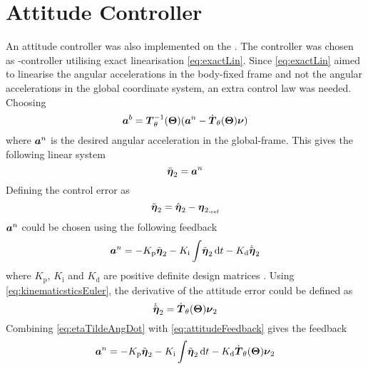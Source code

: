 \section{Attitude Controller}  
An attitude controller was also implemented on the \abbrROV. The controller was chosen as \abbrPID-controller utilising exact linearisation \eqref{eq:exactLin}.
Since \eqref{eq:exactLin} aimed to linearise the angular accelerations in the body-fixed frame and not the angular accelerations in the global coordinate system, an extra control law was needed.
Choosing 
\begin{equation}\label{eq:anLaw}
\accVector^b = \boldsymbol{T}^{-1}_\theta(\eulerAngles)(\accVector^n - \dot{\boldsymbol{T}}_\theta(\eulerAngles)\nuVector)
\end{equation} where $\accVector^n$ is the desired angular acceleration in the global-frame. This gives the following linear system \begin{equation}
\ddot{\boldsymbol{\eta}}_2=\accVector^n 
\end{equation}
Defining the control error as
\begin{equation}
\etaTildeAng = \hat{\etaVector}_2 - \etaVectorAng[,_{\text{ref}}] 
\end{equation}
$\accVector^n$ could be chosen using the following feedback 
\begin{equation}\label{eq:attitudeFeedback}
\accVector^n=-K_{\text{p}} \etaTildeAng - K_{\text{i}}\int \! \etaTildeAng \, \mathrm{d}t - K_{\text{d}} \etaTildeAngdot
\end{equation}
where $K_{\text{p}}$, $K_{\text{i}}$ and $K_{\text{d}}$ are positive definite design matrices \citep[p. 453]{fossen2011}. 
Using \eqref{eq:kinematicsticsEuler}, the derivative of the attitude error could be defined as 
\begin{equation}\label{eq:etaTildeAngDot}
\etaTildeAngdot = \dot{\boldsymbol{T}}_\theta(\eulerAngles)\nuVectorAng
\end{equation}
Combining \eqref{eq:etaTildeAngDot} with \eqref{eq:attitudeFeedback} gives the feedback
\begin{equation}
\accVector^n=-K_{\text{p}} \etaTildeAng - K_{\text{i}}\int \! \etaTildeAng \, \mathrm{d}t - K_{\text{d}} \dot{\boldsymbol{T}}_\theta(\eulerAngles)\nuVectorAng
\end{equation}

